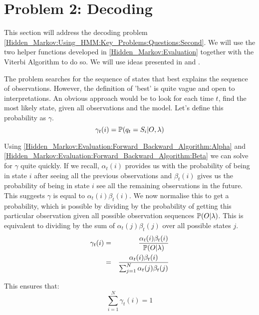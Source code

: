 \section{Problem 2: Decoding}
\label{Hidden_Markov:Decoding}

    This section will address the decoding problem \ref{Hidden_Markov:Using_HMM:Key_Problems:Questions:Second}. We will use the two helper functions developed in \ref{Hidden_Markov:Evaluation} together with the Viterbi Algorithm to do so. We will use ideas presented in \cite{Rabiner1986} and \cite{Forney1973}.

    The problem searches for the sequence of states that best explains the sequence of observations. However, the definition of 'best' is quite vague and open to interpretations. An obvious approach would be to look for each time $t$, find the most likely state, given all observations and the model. Let's define this probability as $\gamma$.
    \begin{equation}
        \label{Hidden_Markov:Decoding:gamma}
        \gamma_t(i) = \mathbb{P} (q_t = S_i | O, \lambda)
    \end{equation}

    Using \ref{Hidden_Markov:Evaluation:Forward_Backward_Algorithm:Alpha} and \ref{Hidden_Markov:Evaluation:Forward_Backward_Algorithm:Beta} we can solve for $\gamma$ quite quickly. If we recall, $\alpha_t(i)$ provides us with the probability of being in state $i$ after seeing all the previous observations and $\beta_t(i)$ gives us the probability of being in state $i$ see all the remaining observations in the future. This suggests $\gamma$ is equal to $\alpha_t(i) \beta_t(i)$. We now normalise this to get a probability, which is possible by dividing by the probability of getting this particular observation given all possible observation sequences $\mathbb{P} (O|\lambda)$. This is equivalent to dividing by the sum of $\alpha_t(j) \beta_t(j)$ over all possible states $j$.
    \begin{eqnarray}
        \gamma_t(i) & = &  \dfrac{\alpha_t(i) \beta_t(i)}{\mathbb{P} (O|\lambda)} \\
                    & = &  \dfrac{\alpha_t(i) \beta_t(i)}{\sum_{j=1}^N \alpha_t(j) \beta_t(j)}
    \end{eqnarray}


    This ensures that:
    \begin{equation}
        \sum_{i=1}^N \gamma_t(i) = 1
    \end{equation}

